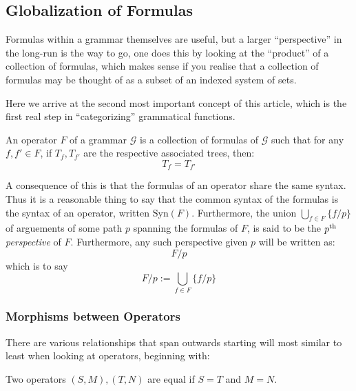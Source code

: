 \documentclass[twoside]{article}
\newenvironment{definition}[1][Definition]{\begin{trivlist}
\item[\hskip \labelsep {\bfseries #1}]}{\end{trivlist}}
\begin{document}
\subsection{Globalization of Formulas}

Formulas within a grammar themselves are useful, but a larger ``perspective'' in the long-run is the way to go, one
does this by looking at the ``product'' of a collection of formulas, which makes sense if you realise that a collection
of formulas may be thought of as a subset of an indexed system of sets.

Here we arrive at the second most important concept of this article, which is the first real step in ``categorizing''
grammatical functions.

\begin{definition}[Operator]

An operator $ F $ of a grammar $ \mathcal{G} $ is a collection of formulas of $ \mathcal{G} $ such that for any
$ f, f'\in F $, if $ T_f, T_{f'} $ are the respective associated trees, then:
$$ T_f=T_{f'} $$

\end{definition}
A consequence of this is that the formulas of an operator share the same syntax.  Thus it is a reasonable thing to say
that the common syntax of the formulas is the syntax of an operator, written $ \mbox{Syn}(F) $.  Furthermore, the union
$ \bigcup_{f\in F} \{f/p\} $ of arguements of some path $ p $ spanning the formulas of $ F $, is said to be the
$ p^{\mbox{\scriptsize th}} $ \emph{perspective} of $ F $.  Furthermore, any such perspective given $ p $ will be
written as:
$$ F/p $$
which is to say
$$ F/p:=\bigcup_{f\in F} \{f/p\} $$

\subsubsection{Morphisms between Operators}

There are various relationships that span outwards starting will most similar to least when looking at operators,
beginning with:

\begin{definition}[Operator Equality]

Two operators $ (S, M), (T, N) $ are equal if $ S=T $ and $ M=N $.

\end{definition}
\end{document}
